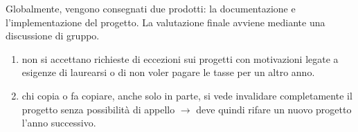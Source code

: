 
Globalmente, vengono consegnati due prodotti: la documentazione e l'implementazione del progetto. La valutazione
finale avviene mediante una discussione di gruppo.

\begin{tcolorbox}[colback=yellow!20!white,colframe=yellow!75!black,title=\textbf{N.B.}]
 \begin{enumerate}
  \item non si accettano richieste di eccezioni sui progetti con motivazioni legate a esigenze di laurearsi o di non voler pagare le tasse per un altro anno.
  \item chi copia o fa copiare, anche solo in parte, si vede invalidare completamente il progetto senza possibilità di appello $\rightarrow$ deve quindi rifare un nuovo progetto l'anno successivo.
 \end{enumerate}
\end{tcolorbox}


